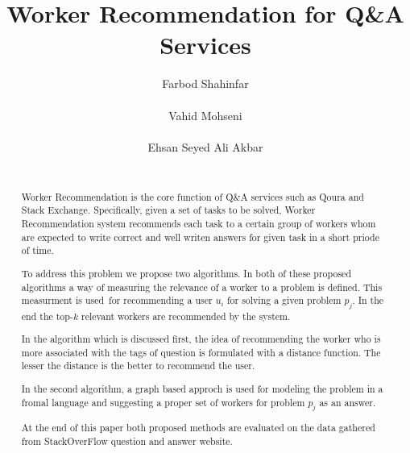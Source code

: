 \documentclass{template}
\begin{document}

\title{Worker Recommendation for Q\&A Services}


\author{
\alignauthor
Farbod Shahinfar\\
       \\
\alignauthor
Vahid Mohseni\\
       \\
\alignauthor
Ehsan Seyed Ali Akbar \\
       \\
}

\maketitle

\begin{abstract}
\label{abstract}
            Worker Recommendation is the core function of Q\&A services 
            such as Qoura and Stack Exchange. 
            Specifically, given a set of tasks to be solved, 
            Worker Recommendation system recommends each
            task to a certain group of workers whom are expected to
            write correct and well writen answers for given task 
            in a short priode of time.

            To address this problem we propose two algorithms. In both
            of these proposed algorithms a way of measuring the relevance of
            a worker to a problem is defined. This measurment is used\
            for recommending a user \(u_i\) for solving a given problem 
            \(p_j\). In the end the top-\(k\) relevant workers are 
            recommended by the system.

            In the algorithm which is discussed first, the idea of
            recommending the worker who is more associated with the tags 
            of question is formulated with a distance function. The lesser
            the distance is the better to recommend the user.

            In the second algorithm, a graph based approch is
            used for modeling the problem in a
            fromal language and suggesting a proper set of
            workers for problem \(p_j\) as an answer.
           
            At the end of this paper both proposed methods are evaluated
            on the data gathered from StackOverFlow question and answer 
            website.
\end{abstract}
\end{document}
